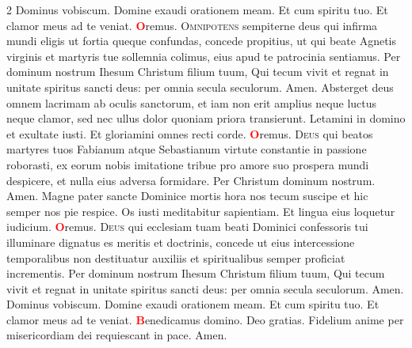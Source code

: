 \begin{multicols}{2}
 Dominus vobiscum.  Domine exaudi orationem meam.
\newline \R Et cum spiritu tuo.  Et clamor meus ad te veniat.
\newline \textcolor{Red}{\bfseries O}remus. 
\lettrine[lines=2]{\zallmancaps \color{Red} O}{mnipotens} sempiterne deus qui infirma mundi eligis ut fortia queque confundas, concede propitius, ut qui beate Agnetis virginis et martyris tue sollemnia colimus, eius apud te patrocinia sentiamus. Per dominum nostrum Ihesum Christum filium tuum, Qui tecum vivit et regnat in unitate spiritus sancti deus: per omnia secula seculorum. \R Amen.
\newline {}
\newline {} Absterget deus omnem lacrimam ab oculis sanctorum, et iam non erit amplius neque luctus neque clamor, sed nec ullus dolor quoniam priora transierunt.
\newline \V Letamini in domino et exultate iusti. \R Et gloriamini omnes recti corde.
\newline \textcolor{Red}{\bfseries O}remus. 
\lettrine[lines=2]{\zallmancaps \color{Blue} D}{eus} qui beatos martyres tuos Fabianum atque Sebastianum virtute constantie in passione roborasti, ex eorum nobis imitatione tribue pro amore suo prospera mundi despicere, et nulla eius adversa formidare. Per Christum dominum nostrum. \R Amen.
\newline {}
\newline {} Magne pater sancte Dominice mortis hora nos tecum suscipe et hic semper nos pie respice.
\newline \V Os iusti meditabitur sapientiam. \R Et lingua eius loquetur iudicium.
\newline \textcolor{Red}{\bfseries O}remus. 
\lettrine[lines=2]{\zallmancaps \color{Blue} D}{eus} \hypertarget{deus-qui-ecclesiam}{\label{deus-qui-ecclesiam}} qui ecclesiam tuam beati Dominici confessoris tui illuminare dignatus es meritis et doctrinis, concede ut eius intercessione temporalibus non destituatur auxiliis et spiritualibus semper proficiat incrementis. Per dominum nostrum Ihesum Christum filium tuum, Qui tecum vivit et regnat in unitate spiritus sancti deus: per omnia secula seculorum. \R Amen.
 Dominus vobiscum.  Domine exaudi orationem meam.
\newline \R Et cum spiritu tuo.  Et clamor meus ad te veniat.
\newline \textcolor{Red}{\bfseries B}enedicamus domino. \R Deo gratias.
\newline {}
\newline Fidelium anime per misericordiam dei requiescant in pace. \R Amen.
\newline {}


\end{multicols}

